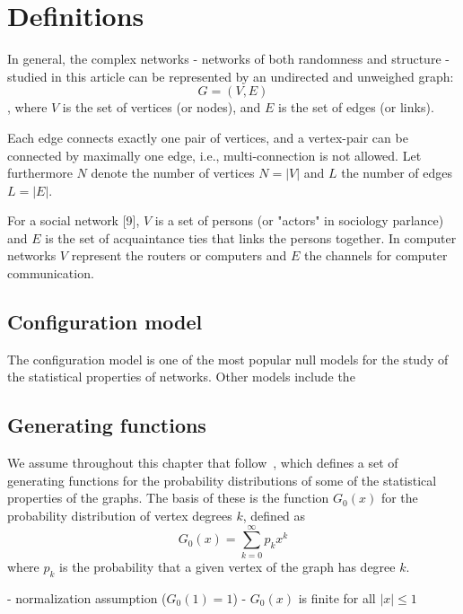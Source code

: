 \chapter{Definitions}

In general, the complex networks - networks of both randomness and structure - studied in this article can be represented by an undirected and unweighed graph:
\begin{equation}
G = (V,E)	
\end{equation}
, where $V$ is the set of vertices (or nodes), and $E$ is the set of edges (or links).

Each edge connects exactly one pair of vertices, and a vertex-pair can be connected by maximally one edge, i.e., multi-connection is not allowed.
Let furthermore $N$ denote the number of vertices $N = |V|$ and $L$ the number of edges $L = |E|$.

For a social network [9], $V$ is a set of persons (or "actors" in sociology parlance) and $E$ is the set of acquaintance ties that links the persons together.
In computer networks $V$ represent the routers or computers and $E$ the channels for computer communication.



\section{Configuration model}

The configuration model is one of the most popular null models for the study of the statistical properties of networks.
Other models include the 


\section{Generating functions}

We assume throughout this chapter that  follow~\cite{Newman:zFi032Kd}, which defines a set of generating functions for the probability distributions of some of the statistical properties of the graphs.
The basis of these is the function $G_0(x)$ for the probability distribution of vertex degrees $k$, defined as
\begin{equation}
G_0(x) = \sum_{k=0}^{\infty} p_k x^k
\end{equation}
where $p_k$ is the probability that a given vertex of the graph has degree $k$.

- normalization assumption ($G_0(1) = 1$)
- $G_0(x)$ is finite for all $|x| \le 1$

